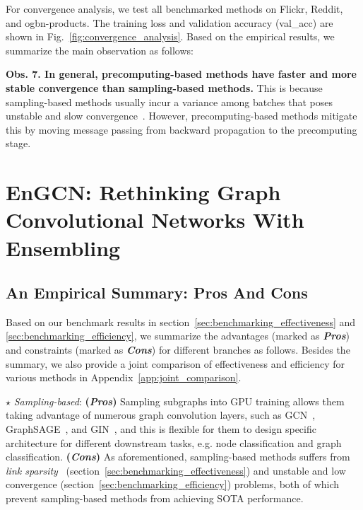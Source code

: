 \message{ !name(main.tex)}\documentclass{article}
\begin{document}
For convergence analysis, we test all benchmarked methods on Flickr, Reddit, and ogbn-products. The training loss and validation accuracy (val\_acc) are shown in Fig.~\ref{fig:convergence_analysis}. Based on the empirical results, we summarize the main observation as follows:

\textbf{Obs. 7. In general, precomputing-based methods have faster and more stable convergence than sampling-based methods.} This is because sampling-based methods usually incur a variance among batches that poses unstable and slow convergence~\cite{cong2020minimal}. However, precomputing-based methods mitigate this by moving message passing from backward propagation to the precomputing stage.

\section{EnGCN: Rethinking Graph Convolutional Networks With Ensembling}\label{sec:engcn}
\vspace{-1mm}
\subsection{An Empirical Summary: Pros And Cons}\label{sec:pros_and_cons}
\vspace{-1mm}

Based on our benchmark results in section~\ref{sec:benchmarking_effectiveness} and \ref{sec:benchmarking_efficiency}, we summarize the advantages (marked as \textit{\textbf{Pros}}) and constraints (marked as \textit{\textbf{Cons}}) for different branches as follows. Besides the summary, we also provide a joint comparison of effectiveness and efficiency for various methods in Appendix~\ref{app:joint_comparison}.

\(\star\) \textit{Sampling-based}: \textbf{(\textit{Pros})} Sampling subgraphs into GPU training allows them taking advantage of numerous graph convolution layers, such as GCN~\cite{kipf2016semi}, GraphSAGE~\cite{hamilton2017inductive}, and GIN~\cite{xu2018powerful}, and this is flexible for them to design specific architecture for different downstream tasks, e.g. node classification and graph classification. \textbf{(\textit{Cons})} As aforementioned, sampling-based methods suffers from \textit{link sparsity}~\cite{zeng2019graphsaint} (section~\ref{sec:benchmarking_effectiveness}) and unstable and low convergence (section~\ref{sec:benchmarking_efficiency}) problems, both of which prevent sampling-based methods from achieving SOTA performance.
\end{document}
